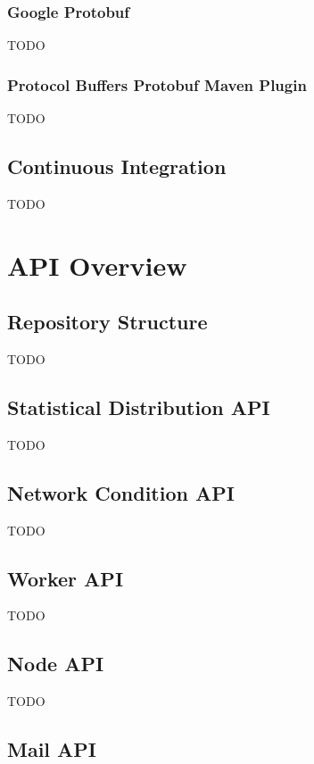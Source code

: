 \subsubsection{Google Protobuf}

TODO

\subsubsection{Protocol Buffers Protobuf Maven Plugin}

TODO

\subsection{Continuous Integration}

TODO


\section{API Overview}

\subsection{Repository Structure}

TODO

\subsection{Statistical Distribution API}

TODO

\subsection{Network Condition API}

TODO

\subsection{Worker API}

TODO

\subsection{Node API}

TODO

\subsection{Mail API}

